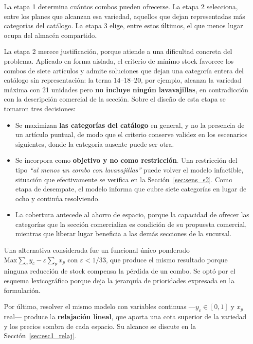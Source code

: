 \documentclass[10pt,a4paper]{article}
\begin{document}
La etapa 1 determina cuántos combos pueden ofrecerse. La etapa 2 selecciona,
entre los planes que alcanzan esa variedad, aquellos que dejan representadas más
categorías del catálogo. La etapa 3 elige, entre estos últimos, el que menos
lugar ocupa del almacén compartido.

La etapa 2 merece justificación, porque atiende a una dificultad concreta del
problema. Aplicado en forma aislada, el criterio de mínimo stock favorece los
combos de siete artículos y admite soluciones que dejan una categoría entera del
catálogo sin representación: la terna 14--18--20, por ejemplo, alcanza la
variedad máxima con 21 unidades pero \textbf{no incluye ningún lavavajillas},
en contradicción con la descripción comercial de la sección. Sobre el diseño de
esta etapa se tomaron tres decisiones:

\begin{itemize}
  \item Se maximizan \textbf{las categorías del catálogo} en general, y no la
  presencia de un artículo puntual, de modo que el criterio conserve validez en
  los escenarios siguientes, donde la categoría ausente puede ser otra.
  \item Se incorpora como \textbf{objetivo y no como restricción}. Una
  restricción del tipo \emph{``al menos un combo con lavavajillas''} puede volver
  el modelo infactible, situación que efectivamente se verifica en la
  Sección~\ref{sec:sens_s2}. Como etapa de desempate, el modelo informa que
  cubre siete categorías en lugar de ocho y continúa resolviendo.
  \item La cobertura antecede al ahorro de espacio, porque la capacidad de
  ofrecer las categorías que la sección comercializa es condición de su
  propuesta comercial, mientras que liberar lugar beneficia a las demás
  secciones de la sucursal.
\end{itemize}

Una alternativa considerada fue un funcional único ponderado
$\text{Max} \sum_c y_c - \varepsilon \sum_p x_p$ con $\varepsilon < 1/33$, que
produce el mismo resultado porque ninguna reducción de stock compensa la pérdida
de un combo. Se optó por el esquema lexicográfico porque deja la jerarquía de
prioridades expresada en la formulación.

Por último, resolver el mismo modelo con variables continuas —$y_c \in [0,1]$ y
$x_p$ real— produce la \textbf{relajación lineal}, que aporta una cota superior
de la variedad y los precios sombra de cada espacio. Su alcance se discute en la
Sección~\ref{sec:esc1_relaj}.
\end{document}
